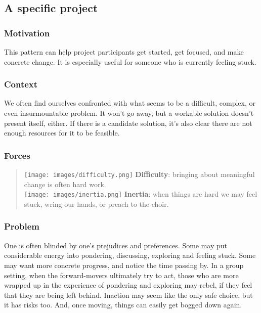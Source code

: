 \hypertarget{a-specific-project}{%
\subsection{A specific project}\label{a-specific-project}}

\hypertarget{motivation}{%
\subsubsection{Motivation}\label{motivation}}

This pattern can help project participants get started, get focused, and
make concrete change. It is especially useful for someone who is
currently feeling stuck.

\hypertarget{context}{%
\subsubsection{Context}\label{context}}

We often find ourselves confronted with what seems to be a difficult,
complex, or even insurmountable problem. It won't go away, but a
workable solution doesn't present itself, either. If there is a
candidate solution, it's also clear there are not enough resources for
it to be feasible.

\hypertarget{forces}{%
\subsubsection{Forces}\label{forces}}

\begin{quote}
\texttt{[image: images/difficulty.png]} \textbf{Difficulty}: bringing
about meaningful change is often hard work.\\
\texttt{[image: images/inertia.png]} \textbf{Inertia}: when things are
hard we may feel stuck, wring our hands, or preach to the choir.
\end{quote}

\hypertarget{problem}{%
\subsubsection{Problem}\label{problem}}

One is often blinded by one's prejudices and preferences. Some may put
considerable energy into pondering, discussing, exploring and feeling
stuck. Some may want more concrete progress, and notice the time passing
by. In a group setting, when the forward-movers ultimately try to act,
those who are more wrapped up in the experience of pondering and
exploring may rebel, if they feel that they are being left behind.
Inaction may seem like the only safe choice, but it has risks too. And,
once moving, things can easily get bogged down again.

